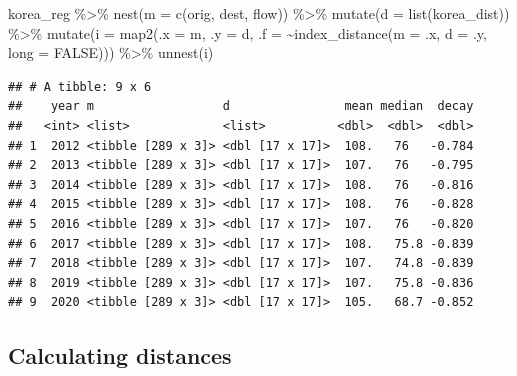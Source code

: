 \documentclass[
]{book}
\newenvironment{Shaded}{\begin{snugshade}}{\end{snugshade}}
\newcommand{\AttributeTok}[1]{\textcolor[rgb]{0.77,0.63,0.00}{#1}}
\newcommand{\ConstantTok}[1]{\textcolor[rgb]{0.00,0.00,0.00}{#1}}
\newcommand{\FunctionTok}[1]{\textcolor[rgb]{0.00,0.00,0.00}{#1}}
\newcommand{\NormalTok}[1]{#1}
\newcommand{\SpecialCharTok}[1]{\textcolor[rgb]{0.00,0.00,0.00}{#1}}
\begin{document}
\begin{Shaded}
\begin{Highlighting}[]
\NormalTok{korea\_reg }\SpecialCharTok{\%\textgreater{}\%}
  \FunctionTok{nest}\NormalTok{(}\AttributeTok{m =} \FunctionTok{c}\NormalTok{(orig, dest, flow)) }\SpecialCharTok{\%\textgreater{}\%}
  \FunctionTok{mutate}\NormalTok{(}\AttributeTok{d =} \FunctionTok{list}\NormalTok{(korea\_dist)) }\SpecialCharTok{\%\textgreater{}\%}
  \FunctionTok{mutate}\NormalTok{(}\AttributeTok{i =} \FunctionTok{map2}\NormalTok{(}\AttributeTok{.x =}\NormalTok{ m, }\AttributeTok{.y =}\NormalTok{ d,}
                  \AttributeTok{.f =} \SpecialCharTok{\textasciitilde{}}\FunctionTok{index\_distance}\NormalTok{(}\AttributeTok{m =}\NormalTok{ .x, }\AttributeTok{d =}\NormalTok{ .y, }\AttributeTok{long =} \ConstantTok{FALSE}\NormalTok{))) }\SpecialCharTok{\%\textgreater{}\%}
  \FunctionTok{unnest}\NormalTok{(i)}
\end{Highlighting}
\end{Shaded}

\begin{verbatim}
## # A tibble: 9 x 6
##    year m                  d                mean median  decay
##   <int> <list>             <list>          <dbl>  <dbl>  <dbl>
## 1  2012 <tibble [289 x 3]> <dbl [17 x 17]>  108.   76   -0.784
## 2  2013 <tibble [289 x 3]> <dbl [17 x 17]>  107.   76   -0.795
## 3  2014 <tibble [289 x 3]> <dbl [17 x 17]>  108.   76   -0.816
## 4  2015 <tibble [289 x 3]> <dbl [17 x 17]>  108.   76   -0.828
## 5  2016 <tibble [289 x 3]> <dbl [17 x 17]>  107.   76   -0.820
## 6  2017 <tibble [289 x 3]> <dbl [17 x 17]>  108.   75.8 -0.839
## 7  2018 <tibble [289 x 3]> <dbl [17 x 17]>  107.   74.8 -0.839
## 8  2019 <tibble [289 x 3]> <dbl [17 x 17]>  107.   75.8 -0.836
## 9  2020 <tibble [289 x 3]> <dbl [17 x 17]>  105.   68.7 -0.852
\end{verbatim}

\hypertarget{calculating-distances}{%
\subsection{Calculating distances}\label{calculating-distances}}
\end{document}
